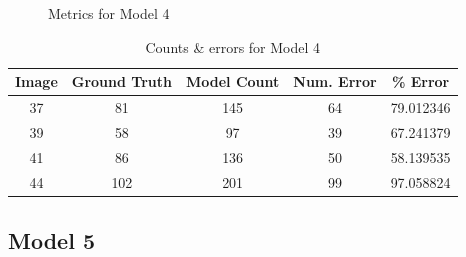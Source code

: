 \begin{appendices}
\begin{figure}[h!]
\caption{Metrics for Model 4}
\end{figure}

\begin{table}[h!]
\centering
\begin{tabular}{||c c c c c||} 
\hline
Image &  Ground Truth &  Model Count &  Num. Error &    \% Error \\
\hline\hline
37 &            81 &          145 &          64 &  79.012346 \\
39 &            58 &           97 &          39 &  67.241379 \\
41 &            86 &          136 &          50 &  58.139535 \\
44 &           102 &          201 &          99 &  97.058824 \\
\hline
\end{tabular}
\caption{Counts \& errors for Model 4}
\label{count_4}
\end{table}

\subsection{Model 5}


\end{appendices}
